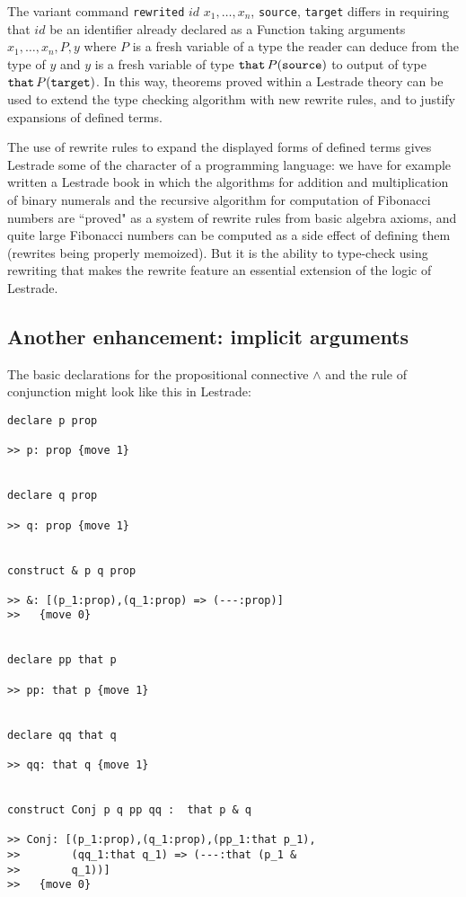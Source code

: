 \documentclass{article}
\begin{document}
The variant command  {\tt rewrited} $id$ $x_1, \ldots, x_n$, {\tt source}, {\tt target} differs in requiring that $id$ be an identifier already declared as a Function taking arguments $x_1,\ldots,x_n,P,y$ where $P$ is a fresh variable of a type the reader can deduce from the type of $y$ and $y$ is a fresh variable of type
${\tt that} \,P({\tt source})$ to output of type ${\tt that}\, P({\tt target})$.  In this way, theorems proved within a Lestrade theory can be used to extend the type checking algorithm with new rewrite rules, and to justify expansions of defined terms.

The use of rewrite rules to expand the displayed forms of defined terms gives Lestrade some of the character of a programming language:  we have for example written a Lestrade book in which the algorithms for addition and multiplication of binary numerals and the recursive algorithm for computation of Fibonacci numbers are ``proved" as a system of rewrite rules from basic algebra axioms, and quite large Fibonacci numbers can be computed as a side effect of defining them (rewrites being properly memoized).  But it is the ability to type-check using rewriting that makes the rewrite feature an essential extension of the logic of Lestrade.

\subsection{Another enhancement:  implicit arguments}

The basic declarations for the propositional connective $\wedge$ and the rule of conjunction might look like this in Lestrade:

\begin{verbatim}
declare p prop

>> p: prop {move 1}


declare q prop

>> q: prop {move 1}


construct & p q prop

>> &: [(p_1:prop),(q_1:prop) => (---:prop)]
>>   {move 0}


declare pp that p

>> pp: that p {move 1}


declare qq that q

>> qq: that q {move 1}


construct Conj p q pp qq :  that p & q

>> Conj: [(p_1:prop),(q_1:prop),(pp_1:that p_1),
>>        (qq_1:that q_1) => (---:that (p_1 & 
>>        q_1))]
>>   {move 0}
\end{verbatim}
\end{document}
